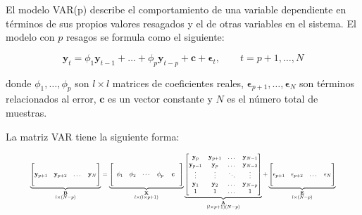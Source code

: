 El modelo VAR(p) describe el comportamiento de una variable dependiente en
términos de sus propios valores resagados y el de otras variables en el
sistema. El modelo con $p$ resagos se formula como el siguiente:

\begin{equation}
\label{eq:var}
 \mathbf{y}_t = \phi_1 \mathbf{y}_{t-1}  + \dots +   \phi_p\mathbf{y}_{t-p}
 + \mathbf{c} + \mathbf{\epsilon}_t, \qquad t=p+1, \dots, N
 \end{equation}

\noindent donde ${\phi_1,\dots,\phi_p}$ son $l \times l$ matrices de
coeficientes reales, $\mathbf{\epsilon}_{p+1},\dots,\mathbf{\epsilon}_N$ son
términos relacionados al error, $\mathbf{c}$ es un vector constante y $N$ es el
número total de muestras.

La matriz VAR tiene la siguiente forma:

\begin{equation}
 \label{eq:varmatrix}
 \resizebox{0.9\hsize}{!}{$%
               \underbrace{ \begin{bmatrix}
               \quad \\
               \mathbf{y}_{p+1} &
               \mathbf{y}_{p+2} &
               \dots & 
               \mathbf{y}_N \\
               \quad
               \end{bmatrix}}_{\substack{ \mathbf{B}\\l \times (N-p)}}   
= 
                \underbrace{\left[ 
                \begin{array}{ccccc}
                \quad & \quad & \quad & \quad & \quad \\
                \phi_1  & \phi_2 & \cdots & \phi_p & \mathbf{c} \\  
                \quad &\quad & \quad & \quad & \quad
               \end{array} 
               \right]}_{\substack{ \mathbf{X}\\ l \times (l \times p + 1 )}}
\underbrace{\begin{bmatrix}
   \mathbf{y}_{p}  & \mathbf{y}_{p+1} & \dots    & \mathbf{y}_{N-1}\\
   \mathbf{y}_{p-1}  & \mathbf{y}_{p} & \dots    & \mathbf{y}_{N-2}\\
   \vdots        & \vdots   & \ddots   & \vdots\\
   \mathbf{y}_{1} & \mathbf{y}_{2}   & \dots    & \mathbf{y}_{N-p}\\
   1 & 1   & \dots    & 1 
   \end{bmatrix}}_{\substack{ \mathbf{A}\\ (l\times p +1 )(N-p)}}
+
\underbrace{\begin{bmatrix}
                \quad \\
              \mathbf{\epsilon}_{p+1}  & 
              \mathbf{\epsilon}_{p+2}  & 
              \dots                & 
              \mathbf{\epsilon}_N \\
              \quad
             \end{bmatrix}}_{\substack{\mathbf{E}\\l \times (N-p) }} 
$}
\end{equation}

